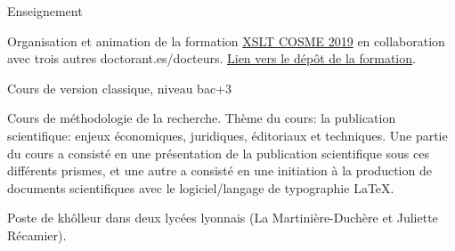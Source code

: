 










\begin{rubric}{Enseignement}
                                \entry*[2018-2019]
                                
                            Organisation et animation de la formation \href{https://cosme.hypotheses.org/1117}{XSLT COSME 2019} en
                        collaboration avec trois autres doctorant.es/docteurs. \href{https://github.com/gabays/Cours\_COSME\_2019}{Lien vers le dépôt de la
                        formation}.
                    
                                \entry*
                            Cours de version classique, niveau bac+3
                    
                                \entry*
                            Cours de méthodologie de la recherche. Thème du cours: la publication
                        scientifique: enjeux économiques, juridiques, éditoriaux et techniques. Une
                        partie du cours a consisté en une présentation de la publication
                        scientifique sous ces différents prismes, et une autre a consisté en une
                        initiation à la production de documents scientifiques avec le
                        logiciel/langage de typographie LaTeX.
                    
                                \entry*[2017-2018]
                                
                            Poste de khôlleur dans deux lycées lyonnais (La Martinière-Duchère et
                        Juliette Récamier).
                    \end{rubric}


